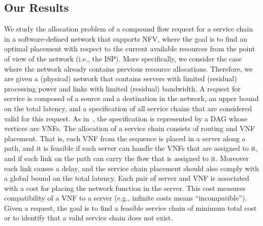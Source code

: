 
\subsection{Our Results}

We study the allocation problem of a compound flow request for a
service chain in a software-defined network that supports NFV, where
the goal is to find an optimal placement with respect to the current
available resources from the point of view of the network (i.e., the
ISP).
%
More specifically, we consider the case where the network already
contains previous resource allocations.  Therefore, we are given a
(physical) network that contains servers with limited (residual)
processing power and links with limited (residual) bandwidth.
%
A request for service is composed of a source and a destination in the
network, an upper bound on the total latency, and a specification of
all service chains that are considered valid for this request.  As
in~\cite{EMP16}, the specification is represented by a DAG whose
vertices are VNFs.
%
The allocation of a service chain consists of routing and VNF
placement.  That is, each VNF from the sequence is placed in a server
along a path, and it is feasible if each server can handle the VNFs
that are assigned to it, and if each link on the path can carry the
flow that is assigned to it.  Moreover each link causes a delay, and
the service chain placement should also comply with a global bound on
the total latency.
%
Each pair of server and VNF is associated with a cost for placing the
network function in the server.  This cost measures compatibility of a
VNF to a server (e.g., infinite costs means ``incompatible'').  Given
a request, the goal is to find a feasible service chain of minimum
total cost or to identify that a valid service chain does not exist.

